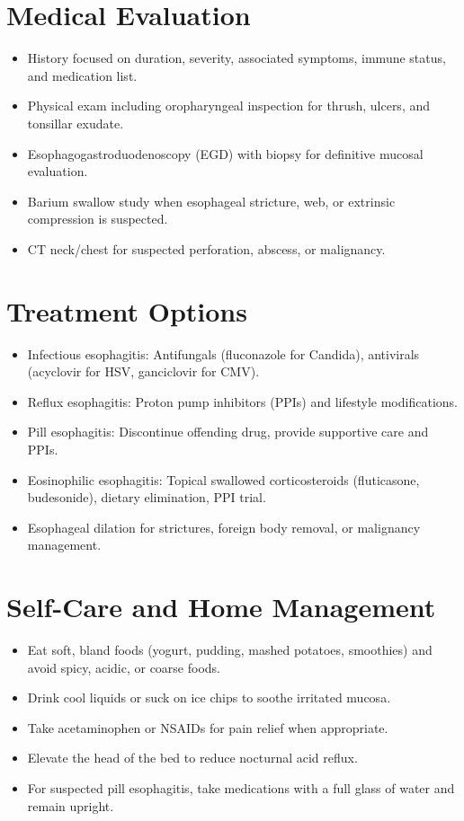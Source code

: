 \section*{Medical Evaluation}
\begin{itemize}
  \item History focused on duration, severity, associated symptoms, immune status, and medication list.
  \item Physical exam including oropharyngeal inspection for thrush, ulcers, and tonsillar exudate.
  \item Esophagogastroduodenoscopy (EGD) with biopsy for definitive mucosal evaluation.
  \item Barium swallow study when esophageal stricture, web, or extrinsic compression is suspected.
  \item CT neck/chest for suspected perforation, abscess, or malignancy.
\end{itemize}

\section*{Treatment Options}
\begin{itemize}
  \item Infectious esophagitis: Antifungals (fluconazole for Candida), antivirals (acyclovir for HSV, ganciclovir for CMV).
  \item Reflux esophagitis: Proton pump inhibitors (PPIs) and lifestyle modifications.
  \item Pill esophagitis: Discontinue offending drug, provide supportive care and PPIs.
  \item Eosinophilic esophagitis: Topical swallowed corticosteroids (fluticasone, budesonide), dietary elimination, PPI trial.
  \item Esophageal dilation for strictures, foreign body removal, or malignancy management.
\end{itemize}

\section*{Self-Care and Home Management}
\begin{itemize}
  \item Eat soft, bland foods (yogurt, pudding, mashed potatoes, smoothies) and avoid spicy, acidic, or coarse foods.
  \item Drink cool liquids or suck on ice chips to soothe irritated mucosa.
  \item Take acetaminophen or NSAIDs for pain relief when appropriate.
  \item Elevate the head of the bed to reduce nocturnal acid reflux.
  \item For suspected pill esophagitis, take medications with a full glass of water and remain upright.
\end{itemize}

